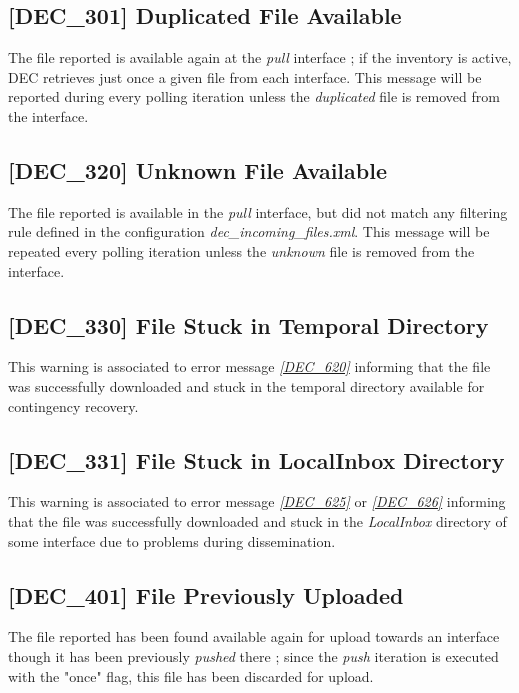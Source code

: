 \documentclass[dec_sum_main.tex]{subfiles}
\begin{document}
\label{DEC301}
\subsection{[DEC\_301] Duplicated File Available}
The file reported is available again at the \textit{pull} interface ; if the inventory is active, DEC retrieves just once a given file from each interface. This message will be reported during every polling iteration unless the \textit{duplicated} file is removed from the interface.

\label{DEC320}
\subsection{[DEC\_320] Unknown File Available}
The file reported is available in the \textit{pull} interface, but did not match any filtering rule defined in the configuration \textit{dec\_incoming\_files.xml}. This message will be repeated every polling iteration unless the \textit{unknown} file is removed from the interface.

\label{DEC330}
\subsection{[DEC\_330] File Stuck in Temporal Directory}
This warning is associated to error message \hyperref[DEC620]{\textit{[DEC\_620]}} informing that the file was successfully downloaded and stuck in the temporal directory available for contingency recovery.

\label{DEC331}
\subsection{[DEC\_331] File Stuck in LocalInbox Directory}
This warning is associated to error message \hyperref[DEC625]{\textit{[DEC\_625]}} or \hyperref[DEC626]{\textit{[DEC\_626]}} informing that the file was successfully downloaded and stuck in the \textit{LocalInbox} directory of some interface due to problems during dissemination.

\label{DEC401}
\subsection{[DEC\_401] File Previously Uploaded}
The file reported has been found available again for upload towards an interface though it has been previously \textit{pushed} there ; since the \textit{push} iteration is executed with the "once" flag, this file has been discarded for upload.
\end{document}
